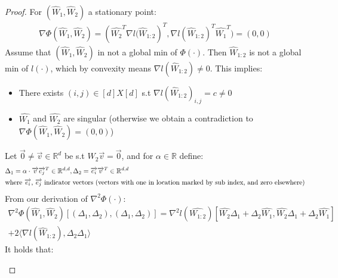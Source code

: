 \documentclass[12pt]{article}
\begin{document}
    \begin{proof}
    For $({\widehat{W}_1}, {\widehat{W}_2})$ a stationary point:
    \begin{align*}
        {\nabla\Phi}{({\widehat{W}_1}, {\widehat{W}_2})}
        =
        ({\widehat{W_2}^T} {\nabla{l}{({\widehat{W}_{1:2}}}})^T,
        {\nabla{l}{({\widehat{W}_{1:2}})}^T}{\widehat{W_1}^T})
        =
        (0, 0)
    \end{align*}
    Assume that $({\widehat{W}_1}, {\widehat{W}_2})$ in not a global min of $\Phi(\cdot)$. Then ${\widehat{W}_{1:2}}$ is not a global min of $l(\cdot)$, which by convexity means ${\nabla{l}}{({\widehat{W}_{1:2}})} \neq 0$. This implies:
    \\
    \begin{itemize}
        \item There exists $(i, j) \in [d]X[d]$ s.t ${{\nabla{l}}{({\widehat{W}_{1:2}})}_{i,j}}
        = c \neq 0$
        \item $\widehat{W_1}$ and $\widehat{W_2}$ are singular (otherwise we obtain a contradiction to ${\nabla\Phi}{({\widehat{W}_1}, {\widehat{W}_2})} = (0,0)$)
    \end{itemize}
    Let $\overrightarrow{0} \neq \overrightarrow{v} \in {\mathbb{R}^d}$ be s.t ${W_2}\overrightarrow{v} = \overrightarrow{0}$, and for $\alpha \in \mathbb{R}$ define:
    \begin{align*}
        \Delta_1 = \alpha \cdot \overrightarrow{v} {\overrightarrow{e_j}^T} \in {\mathbb{R}^{d,d}},
        \Delta_2 = \overrightarrow{e_i} {\overrightarrow{v}^T} \in {\mathbb{R}^{d,d}}
        \\
        \intertext{where $\overrightarrow{e_i}$,  $\overrightarrow{e_j}$ indicator vectors (vectors with one in location marked by sub index, and zero elsewhere)}
    \end{align*}
    From our derivation of ${\nabla^2}{\Phi(\cdot)}$:
    \begin{align*}
        {{\nabla}^{2}}{\Phi{({\widehat{W}_1}, {\widehat{W}_2})}}[
        (\Delta_1,\Delta_2),
        (\Delta_1,\Delta_2)
        ]
        =
        {{\nabla}^{2}}{l}(\widehat{W_{1:2}})[
         \widehat{W_2}{\Delta_1} + {\Delta_2}\widehat{W_1},
         \widehat{W_2}{\Delta_1} + {\Delta_2}\widehat{W_1}
        ]
        \\
        +
        2 \langle
        {\nabla{l}}{({\widehat{W}_{1:2}})}
        ,
        \Delta_2 \Delta_1
        \rangle
    \end{align*}
    It holds that:
    \begin{itemize}

\end{itemize}
\end{proof}
\end{document}
